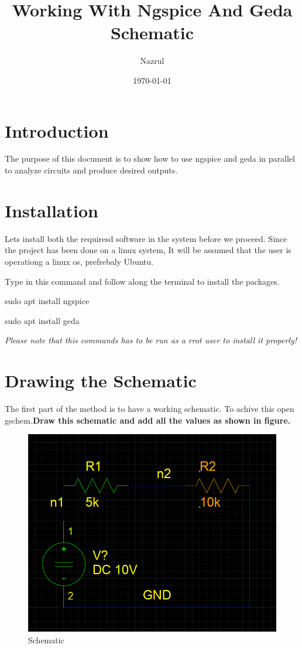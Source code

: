 \documentclass[a4paper,12pt]{article}
\begin{document}
\title{\textbf{Working With Ngspice And Geda Schematic}}
\author{Nazrul}
\date{\today}
\maketitle

\tableofcontents
\newpage
{}

\section{Introduction}
The purpose of this document is to show how to use ngspice and geda in parallel to analyze circuits and produce desired outputs.

\section{Installation}
Lets install both the requiresd software in the system before we proceed. Since the project has been done on a linux system, It will be assumed that the user is operationg a linux os, prefrebaly Ubuntu.

Type in this command and follow along the terminal to install the packages.

{\color{green}sudo apt install ngspice}

{\color{green}sudo apt install geda}

\textit{\color{red}Please note that this commands has to be run as a rrot user to install it properly!}

\newpage

\section{Drawing the Schematic}

The first part of the method is to have a working schematic. To achive this open gschem.\textbf{Draw this schematic and add all the values as shown in figure.}

\begin{figure}[h!]
\centering
\includegraphics[width=1\textwidth]{Schematic.png}
\caption{Schematic}
\end{figure}
\end{document}
